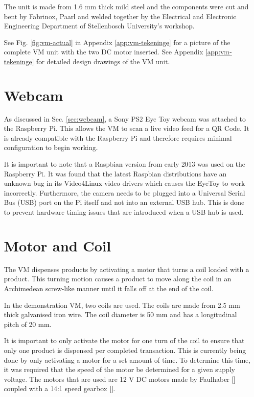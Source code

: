 The unit is made from 1.6 mm thick mild steel and the components were cut and
bent by Fabrinox, Paarl and welded together by the Electrical and Electronic
Engineering Department of Stellenbosch University's workshop.

See Fig. \ref{fig:vm-actual} in Appendix \ref{app:vm-tekeninge} for a picture of the
complete VM unit with the two DC motor inserted. See Appendix \ref{app:vm-tekeninge} for
detailed design drawings of the VM unit.

\section{Webcam}

As discussed in Sec. \ref{sec:webcam}, a Sony PS2 Eye Toy  webcam was
attached to the Raspberry Pi. This allows the VM to scan a live
video feed for a QR Code. It is already compatible with the Raspberry Pi and
therefore requires minimal configuration to begin working.

It is important to note that a Raspbian version from early 2013 was used on the
Raspberry Pi. It was found that the latest Raspbian distributions have an
unknown bug in its Video4Linux video drivers which causes the EyeToy to
work incorrectly. Furthermore, the camera needs to be plugged into a Universal Serial Bus
(USB) port on the Pi itself and not into an external USB hub. This is done to prevent
hardware timing issues that are introduced when a USB hub is used.

\section{Motor and Coil}

The VM dispenses products by activating a motor that turns a coil
loaded with a product. This turning motion causes a product to move along the
coil in an Archimedean screw-like manner until it falls off at the end of the
coil. 

In the demonstration VM, two coils are used. The coils are made
from 2.5 mm thick galvanised iron wire. The coil diameter is 50 mm and has a
longitudinal pitch of 20 mm. 

It is important to only activate the motor for one turn of the coil to
ensure that only one product is dispensed per completed transaction. This is
currently being done by only activating a motor for a set amount of time. To
determine this time, it was required that the speed of the motor be
determined for a given supply voltage. The motors that are used are 12 V DC motors made
by Faulhaber [\cite{manual:dc-motors}] coupled with a 14:1 speed gearbox
[\cite{manual:gearbox}].

